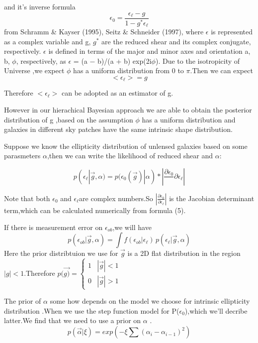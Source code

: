 \documentclass[useAMS,usenatbib]{mn2e}
\begin{document}
and it's inverse formula 
\begin{equation}
\epsilon_{0}=\frac{\epsilon_{\ell}-g}{1-g^{*}\epsilon_{\ell}}
\end{equation}
from Schramm \& Kayser (1995), Seitz \& Schneider (1997), where $\epsilon$
is represented as a complex variable and g, $g^{*}$ are the reduced
shear and its complex conjugate, respectively. $\epsilon$ is defined
in terms of the major and minor axes and orientation a, b, $\phi$,
respectively, as $\epsilon$ = (a − b)/(a + b) exp(2i$\phi$). Due to the isotropicity
of Universe ,we expect $\phi$ has a uniform distribution from 0 to
$\pi$.Then we can expect 
\begin{equation}
<\epsilon_{\ell}>=g
\end{equation}


Therefore $<\epsilon_{\ell}>$ can be adopted as an estimator of g.

However in our hierachical Bayesian approach we are able to obtain
the posterior distribution of g ,based on the assumption  $\phi$ has a uniform distribution and galaxies in different
sky patches have the same intrinsic shape distribution.

Suppose we know the ellipticity distribution of unlensed galaxies
based on some parasmeters $\alpha$,then we can write the likelihood of reduced shear and $\alpha$:

\begin{equation}
p(\epsilon_{\ell}|\vec{g},\alpha)=p(\epsilon_{0}(\vec{g})|\alpha)*|\frac{\partial\epsilon_{0}}\,{\partial\epsilon_{\ell}}|
\end{equation}


Note that both $\epsilon_{0}$ and $\epsilon_{\ell}$are complex numbers.So
$|\frac{\partial\epsilon_{0}}{\partial\epsilon_{\ell}}|$ is the Jacobian
determinant term,which can be calculated numerically from formula
(5).

If there is measurement error on $\epsilon_{ob}$,we will have 
\begin{equation}
p(\epsilon_{ob}|\vec{g},\alpha)=\int f(\epsilon_{ob}|\epsilon_{\ell})\,p(\epsilon_{\ell}|\vec{g},\alpha)
\end{equation}
Here the prior distribtuion we use for $\vec{g}$ is a 2D flat distribution
in the region $|g|<1$.Therefore $p(\vec{g)}=\begin{cases}
1 & |\vec{g}|<1\\
0 & |\vec{g}|>1
\end{cases}$

The prior of $\alpha$ some how depends on the model we choose for
intrinsic ellipticity distribution .When we use the step function
model for P($\epsilon_{0}$),which we'll decribe latter.We find that
we need to use a prior on $\alpha$ .
\begin{equation}
p(\vec{\alpha}|\xi)=exp(-\xi\sum(\alpha_{i}-\alpha_{i-1})^{2})
\end{equation}
\end{document}
